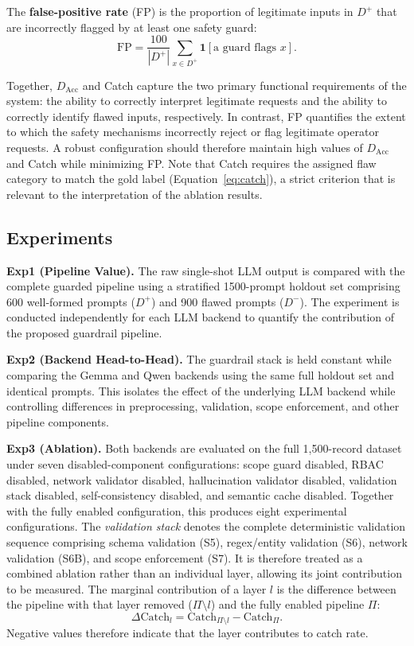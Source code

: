 \documentclass[a4paper,twoside]{article}
\begin{document}
The \textbf{false-positive rate} (FP) is the proportion of legitimate inputs in $D^+$ that are incorrectly flagged by at least one safety guard:
\begin{equation}\label{eq:fp}
\mathrm{FP}=\frac{100}{|D^+|}\sum_{x\in D^+}\mathbf{1}\left[\text{a guard flags } x\right].
\end{equation}

Together, $D_{\mathrm{Acc}}$ and Catch capture the two primary functional requirements of the system: the ability to correctly interpret legitimate requests and the ability to correctly identify flawed inputs, respectively. In contrast, FP quantifies the extent to which the safety mechanisms incorrectly reject or flag legitimate operator requests. A robust configuration should therefore maintain high values of $D_{\mathrm{Acc}}$ and Catch while minimizing FP. Note that Catch requires the assigned flaw category to match the gold label (Equation~\ref{eq:catch}), a strict criterion that is relevant to the interpretation of the ablation results.

\subsection{Experiments}

\noindent \textbf{Exp1 (Pipeline Value).} The raw single-shot LLM output is compared with the complete guarded pipeline using a stratified 1500-prompt holdout set comprising 600 well-formed prompts ($D^+$) and 900 flawed prompts ($D^-$). The experiment is conducted independently for each LLM backend to quantify the contribution of the proposed guardrail pipeline.

\textbf{Exp2 (Backend Head-to-Head).} The guardrail stack is held constant while comparing the Gemma and Qwen backends using the same full holdout set and identical prompts. This isolates the effect of the underlying LLM backend while controlling differences in preprocessing, validation, scope enforcement, and other pipeline components.

\textbf{Exp3 (Ablation).} Both backends are evaluated on the full 1,500-record dataset under seven disabled-component configurations: scope guard disabled, RBAC disabled, network validator disabled, hallucination validator disabled, validation stack disabled, self-consistency disabled, and semantic cache disabled. Together with the fully enabled configuration, this produces eight experimental configurations. The \emph{validation stack} denotes the complete deterministic validation sequence comprising schema validation (S5), regex/entity validation (S6), network validation (S6B), and scope enforcement (S7). It is therefore treated as a combined ablation rather than an individual layer, allowing its joint contribution to be measured. The marginal contribution of a layer $l$ is the difference between the pipeline with that layer removed ($\Pi\setminus l$) and the fully enabled pipeline $\Pi$:
\begin{equation}\label{eq:delta}
\Delta\mathrm{Catch}_l=\mathrm{Catch}_{\Pi\setminus l}-\mathrm{Catch}_{\Pi}.
\end{equation}
Negative values therefore indicate that the layer contributes to catch rate.
\end{document}
